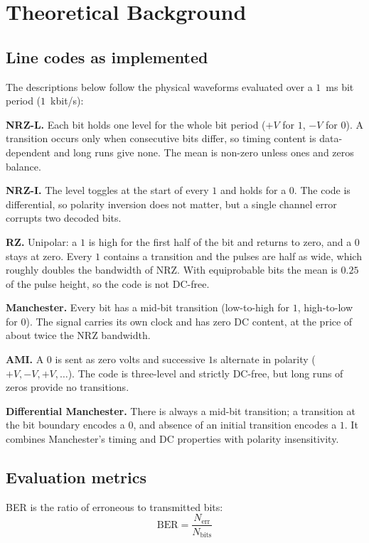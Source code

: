 \documentclass[conference]{IEEEtran}
\begin{document}
\section{Theoretical Background}

\subsection{Line codes as implemented}
The descriptions below follow the physical waveforms evaluated over a $1$~ms bit period ($1$~kbit/s):

\textbf{NRZ-L.} Each bit holds one level for the whole bit period ($+V$ for $1$, $-V$ for $0$). A transition occurs only when consecutive bits differ, so timing content is data-dependent and long runs give none. The mean is non-zero unless ones and zeros balance.

\textbf{NRZ-I.} The level toggles at the start of every $1$ and holds for a $0$. The code is differential, so polarity inversion does not matter, but a single channel error corrupts two decoded bits.

\textbf{RZ.} Unipolar: a $1$ is high for the first half of the bit and returns to zero, and a $0$ stays at zero. Every $1$ contains a transition and the pulses are half as wide, which roughly doubles the bandwidth of NRZ. With equiprobable bits the mean is $0.25$ of the pulse height, so the code is not DC-free.

\textbf{Manchester.} Every bit has a mid-bit transition (low-to-high for $1$, high-to-low for $0$). The signal carries its own clock and has zero DC content, at the price of about twice the NRZ bandwidth.

\textbf{AMI.} A $0$ is sent as zero volts and successive $1$s alternate in polarity ($+V, -V, +V, \dots$). The code is three-level and strictly DC-free, but long runs of zeros provide no transitions.

\textbf{Differential Manchester.} There is always a mid-bit transition; a transition at the bit boundary encodes a $0$, and absence of an initial transition encodes a $1$. It combines Manchester's timing and DC properties with polarity insensitivity.

\subsection{Evaluation metrics}
BER is the ratio of erroneous to transmitted bits:
\begin{equation}
\text{BER} = \frac{N_{\text{err}}}{N_{\text{bits}}}
\end{equation}
\end{document}
